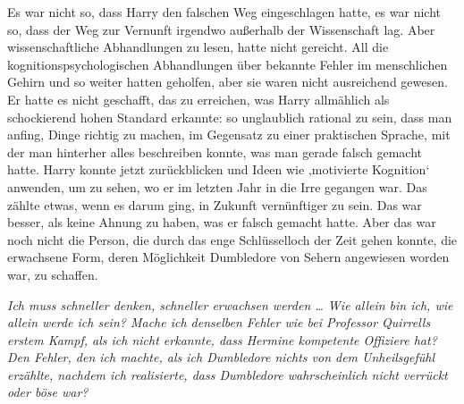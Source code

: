 Es war nicht so, dass Harry den falschen Weg eingeschlagen hatte, es war nicht so, dass der Weg zur Vernunft irgendwo außerhalb der Wissenschaft lag. Aber wissenschaftliche Abhandlungen zu lesen, hatte nicht gereicht. All die kognitionspsychologischen Abhandlungen über bekannte Fehler im menschlichen Gehirn und so weiter hatten geholfen, aber sie waren nicht ausreichend gewesen. Er hatte es nicht geschafft, das zu erreichen, was Harry allmählich als schockierend hohen Standard erkannte: so unglaublich rational zu sein, dass man anfing, Dinge richtig zu machen, im Gegensatz zu einer praktischen Sprache, mit der man hinterher alles beschreiben konnte, was man gerade falsch gemacht hatte. Harry konnte jetzt zurückblicken und Ideen wie ‚motivierte Kognition‘ anwenden, um zu sehen, wo er im letzten Jahr in die Irre gegangen war. Das zählte etwas, wenn es darum ging, in Zukunft vernünftiger zu sein. Das war besser, als keine Ahnung zu haben, was er falsch gemacht hatte. Aber das war noch nicht die Person, die durch das enge Schlüsselloch der Zeit gehen konnte, die erwachsene Form, deren Möglichkeit Dumbledore von Sehern angewiesen worden war, zu schaffen.

\emph{Ich muss schneller denken, schneller erwachsen werden … Wie allein bin ich, wie allein werde ich sein? Mache ich denselben Fehler wie bei Professor Quirrells erstem Kampf, als ich nicht erkannte, dass Hermine kompetente Offiziere hat? Den Fehler, den ich machte, als ich Dumbledore nichts von dem Unheilsgefühl erzählte, nachdem ich realisierte, dass Dumbledore wahrscheinlich nicht verrückt oder böse war?}

